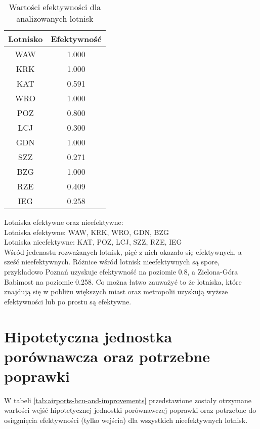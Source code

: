 \documentclass[a4paper,12pt]{article}
\begin{document}
\begin{table}[H]
    \centering
    \begin{tabular}{c|c}
    \hline
         Lotnisko & Efektywność  \\ \hline
         WAW & 1.000 \\
         KRK & 1.000 \\
         KAT & 0.591 \\
         WRO & 1.000 \\
         POZ & 0.800 \\
         LCJ & 0.300 \\
         GDN & 1.000 \\
         SZZ & 0.271 \\
         BZG & 1.000 \\
         RZE & 0.409 \\
         IEG & 0.258 \\   
    \hline
    \end{tabular}
    \caption{Wartości efektywności dla analizowanych lotnisk}
    \label{tab:airports-efficiency}
\end{table}

\noindent Lotniska efektywne oraz nieefektywne: \\
Lotniska efektywne: WAW, KRK, WRO, GDN, BZG \\
Lotniska nieefektywne: KAT, POZ, LCJ, SZZ, RZE, IEG \\
Wśród jedenastu rozważanych lotnisk, pięć z nich okazało się efektywnych, a sześć nieefektywnych.
Różnice wśród lotnisk nieefektywnych są spore, przykładowo Poznań uzyskuje efektywność na poziomie 0.8, a Zielona-Góra Babimost na poziomie 0.258.
Co można łatwo zauważyć to że lotniska, które znajdują się w pobliżu większych miast oraz metropolii uzyskują wyższe efektywności lub po prostu są efektywne.


\section{Hipotetyczna jednostka porównawcza oraz potrzebne poprawki}

W tabeli \ref{tab:airports-hcu-and-improvements} przedstawione zostały otrzymane wartości wejść hipotetycznej jednostki porównawczej poprawki oraz potrzebne do osiągnięcia efektywności (tylko wejścia) dla wszystkich nieefektywnych lotnisk.
\end{document}
